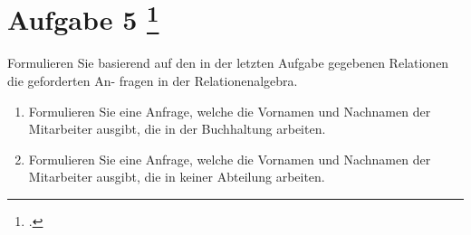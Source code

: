 \documentclass{lehramt-informatik-aufgabe}
\begin{document}
\section{Aufgabe 5
\footcite{66116:2021:03}}

Formulieren Sie basierend auf den in der letzten Aufgabe gegebenen
Relationen die geforderten An- fragen in der Relationenalgebra.

\begin{enumerate}


\item Formulieren Sie eine Anfrage, welche die Vornamen und Nachnamen
der Mitarbeiter ausgibt, die in der Buchhaltung arbeiten.


\item Formulieren Sie eine Anfrage, welche die Vornamen und Nachnamen
der Mitarbeiter ausgibt, die in keiner Abteilung arbeiten.
\end{enumerate}
\end{document}
